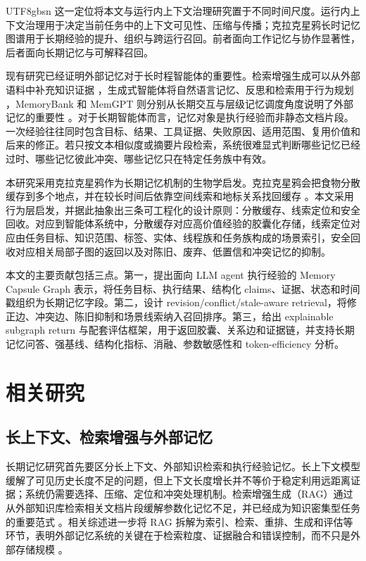 \documentclass[a4paper,fleqn]{cas-sc}
\begin{document}
\begin{CJK*}{UTF8}{gbsn}
这一定位将本文与运行内上下文治理研究置于不同时间尺度。运行内上下文治理用于决定当前任务中的上下文可见性、压缩与传播；克拉克星鸦长时记忆图谱用于长期经验的提升、组织与跨运行召回。前者面向工作记忆与协作显著性，后者面向长期记忆与可解释召回。

现有研究已经证明外部记忆对于长时程智能体的重要性。检索增强生成可以从外部语料中补充知识证据 \citep{lewis2020rag}，生成式智能体将自然语言记忆、反思和检索用于行为规划 \citep{park2023generative}，MemoryBank 和 MemGPT 则分别从长期交互与层级记忆调度角度说明了外部记忆的重要性 \citep{zhong2024memorybank,packer2023memgpt}。对于长期智能体而言，记忆对象是执行经验而非静态文档片段。一次经验往往同时包含目标、结果、工具证据、失败原因、适用范围、复用价值和后来的修正。若只按文本相似度或摘要片段检索，系统很难显式判断哪些记忆已经过时、哪些记忆彼此冲突、哪些记忆只在特定任务族中有效。

本研究采用克拉克星鸦作为长期记忆机制的生物学启发。克拉克星鸦会把食物分散缓存到多个地点，并在较长时间后依靠空间线索和地标关系找回缓存 \citep{kamil1997nutcracker,cornellClarksNutcracker,nps2018clarksnutcracker}。本文采用行为层启发，并据此抽象出三条可工程化的设计原则：分散缓存、线索定位和安全回收。对应到智能体系统中，分散缓存对应高价值经验的胶囊化存储，线索定位对应由任务目标、知识范围、标签、实体、线程族和任务族构成的场景索引，安全回收对应相关局部子图的返回以及对陈旧、废弃、低置信和冲突记忆的抑制。

本文的主要贡献包括三点。第一，提出面向 LLM agent 执行经验的 Memory Capsule Graph 表示，将任务目标、执行结果、结构化 claims、证据、状态和时间戳组织为长期记忆字段。第二，设计 revision/conflict/stale-aware retrieval，将修正边、冲突边、陈旧抑制和场景线索纳入召回排序。第三，给出 explainable subgraph return 与配套评估框架，用于返回胶囊、关系边和证据链，并支持长期记忆问答、强基线、结构化指标、消融、参数敏感性和 token-efficiency 分析。

\section{相关研究}

\subsection{长上下文、检索增强与外部记忆}

长期记忆研究首先要区分长上下文、外部知识检索和执行经验记忆。长上下文模型缓解了可见历史长度不足的问题，但上下文长度增长并不等价于稳定利用远距离证据；系统仍需要选择、压缩、定位和冲突处理机制。检索增强生成（RAG）通过从外部知识库检索相关文档片段缓解参数化记忆不足，并已经成为知识密集型任务的重要范式 \citep{lewis2020rag}。相关综述进一步将 RAG 拆解为索引、检索、重排、生成和评估等环节，表明外部记忆系统的关键在于检索粒度、证据融合和错误控制，而不只是外部存储规模 \citep{gao2023ragsurvey}。


\end{CJK*}
\end{document}

